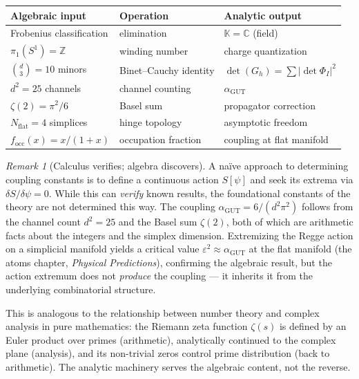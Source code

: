 \documentclass[12pt]{article}
\theoremstyle{remark}
\newtheorem{remark}[theorem]{Remark}
\theoremstyle{definition}
\begin{document}
\begin{center}
\begin{tabular}{lll}
\toprule
\textbf{Algebraic input} & \textbf{Operation} & \textbf{Analytic output} \\
\midrule
Frobenius classification & elimination & $\mathbb{K} = \mathbb{C}$ (field) \\
$\pi_1(S^1) = \mathbb{Z}$ & winding number & charge quantization \\
$\binom{d}{3} = 10$ minors & Binet--Cauchy identity & $\det(G_h) = \sum|\det \Phi_I|^2$ \\
$d^2 = 25$ channels & channel counting & $\alpha_{\mathrm{GUT}}$ \\
$\zeta(2) = \pi^2/6$ & Basel sum & propagator correction \\
$N_{\mathrm{flat}} = 4$ simplices & hinge topology & asymptotic freedom \\
$f_{\mathrm{occ}}(x) = x/(1+x)$ & occupation fraction & coupling at flat manifold \\
\bottomrule
\end{tabular}
\end{center}

\begin{remark}[Calculus verifies; algebra discovers]
A na\"ive approach to determining coupling constants is to define a continuous action $S[\psi]$ and seek its extrema via $\delta S/\delta\psi = 0$. While this can \emph{verify} known results, the foundational constants of the theory are not determined this way. The coupling $\alpha_{\mathrm{GUT}} = 6/(d^2\pi^2)$ follows from the channel count $d^2 = 25$ and the Basel sum $\zeta(2)$, both of which are arithmetic facts about the integers and the simplex dimension. Extremizing the Regge action on a simplicial manifold yields a critical value $\varepsilon^2 \approx \alpha_{\mathrm{GUT}}$ at the flat manifold (the atoms chapter, \textit{Physical Predictions}), confirming the algebraic result, but the action extremum does not \emph{produce} the coupling --- it inherits it from the underlying combinatorial structure.

This is analogous to the relationship between number theory and complex analysis in pure mathematics: the Riemann zeta function $\zeta(s)$ is defined by an Euler product over primes (arithmetic), analytically continued to the complex plane (analysis), and its non-trivial zeros control prime distribution (back to arithmetic). The analytic machinery serves the algebraic content, not the reverse.
\end{remark}
\end{document}
